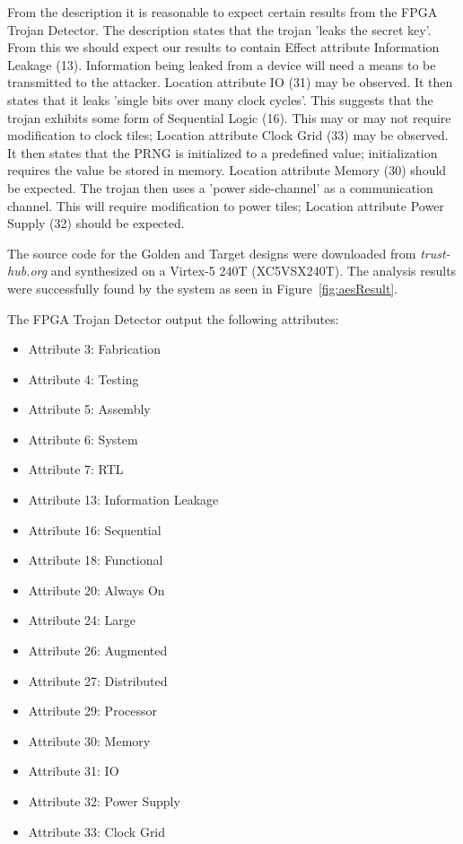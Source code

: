 \documentclass[journal, hidelinks]{IEEEtran}
\begin{document}
From the description it is reasonable to expect certain results from the FPGA Trojan Detector.
The description states that the trojan 'leaks the secret key'.
From this we should expect our results to contain Effect attribute Information Leakage (13).
Information being leaked from a device will need a means to be transmitted to the attacker.
Location attribute IO (31) may be observed.
It then states that it leaks 'single bits over many clock cycles'. 
This suggests that the trojan exhibits some form of Sequential Logic (16).
This may or may not require modification to clock tiles; Location attribute Clock Grid (33) may be observed. 
It then states that the PRNG is initialized to a predefined value; initialization requires the value be stored in memory. 
Location attribute Memory (30) should be expected.
The trojan then uses a 'power side-channel' as a communication channel.
This will require modification to power tiles; Location attribute Power Supply (32) should be expected.

The source code for the Golden and Target designs were downloaded from \textit{trust-hub.org} and synthesized on a Virtex-5 240T  (XC5VSX240T).
The analysis results were successfully found by the system as seen in Figure~\ref{fig:aesResult}.


The FPGA Trojan Detector output the following attributes:
\begin{itemize}
	\item Attribute 3: Fabrication
	\item Attribute 4: Testing
	\item Attribute 5: Assembly
	\item Attribute 6: System
	\item Attribute 7: RTL
	\item Attribute 13: Information Leakage
	\item Attribute 16: Sequential
	\item Attribute 18: Functional
	\item Attribute 20: Always On
	\item Attribute 24: Large
	\item Attribute 26: Augmented
	\item Attribute 27: Distributed
	\item Attribute 29: Processor
	\item Attribute 30: Memory
	\item Attribute 31: IO
	\item Attribute 32: Power Supply
	\item Attribute 33: Clock Grid
\end{itemize}
\end{document}
